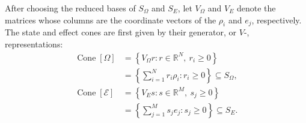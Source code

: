 \documentclass[aps,pra,twocolumn,superscriptaddress,nofootinbib]{revtex4-2}
\newcommand{\E}{\mathcal{E}}
\newcommand{\OmegaSet}{\Omega}
\newcommand{\Cone}{\operatorname{Cone}}
\newcommand{\reals}{\mathbb{R}}
\begin{document}
After choosing the reduced bases of $S_\Omega$ and $S_E$, let $V_\Omega$ and
$V_E$ denote the matrices whose columns are the coordinate vectors of the
$\rho_i$ and $e_j$, respectively.  The state and effect cones are first given
by their generator, or $V$-, representations:
\begin{align}
        \Cone[\OmegaSet]
        &=
        \left\{
        V_\Omega r : r\in\reals^N,\ r_i\ge 0
        \right\}                                                   \nonumber\\
        &=
        \left\{
        \sum_{i=1}^N r_i\rho_i : r_i\ge 0
        \right\}
        \subseteq S_\Omega,
        \label{eq:state-cone-vrep}
        \\
        \Cone[\E]
        &=
        \left\{
        V_E s : s\in\reals^M,\ s_j\ge 0
        \right\}                                                   \nonumber\\
        &=
        \left\{
        \sum_{j=1}^M s_j e_j : s_j\ge 0
        \right\}
        \subseteq S_E.
        \label{eq:effect-cone-vrep}
\end{align}
\end{document}
